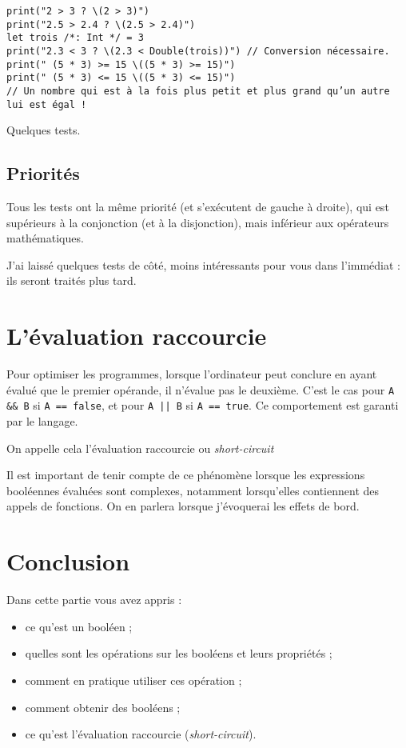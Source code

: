 \begin{listing}[h]
\begin{verbatim}
print("2 > 3 ? \(2 > 3)")
print("2.5 > 2.4 ? \(2.5 > 2.4)")
let trois /*: Int */ = 3
print("2.3 < 3 ? \(2.3 < Double(trois))") // Conversion nécessaire.
print(" (5 * 3) >= 15 \((5 * 3) >= 15)")
print(" (5 * 3) <= 15 \((5 * 3) <= 15)")
// Un nombre qui est à la fois plus petit et plus grand qu’un autre lui est égal !

\end{verbatim}
\caption{Quelques tests.}
\end{listing}%
\subsection{Priorités}
Tous les tests ont la même priorité
(et s'exécutent de gauche à droite),
qui est supérieurs à la conjonction (et à la disjonction),
mais inférieur aux opérateurs mathématiques.



J'ai laissé quelques tests de côté, moins intéressants pour vous dans l'immédiat : ils seront traités plus tard.
\section{L'évaluation raccourcie}
Pour optimiser les programmes, lorsque l'ordinateur peut conclure en ayant évalué que le premier opérande, il n'évalue pas le deuxième. C'est le cas pour \texttt{A && B} si \texttt{A == false},
et pour \texttt{A || B} si \texttt{A == true}.
Ce comportement est garanti par le langage.

On appelle cela l'évaluation raccourcie ou \emph{short-circuit}

Il est important de tenir compte de ce phénomène lorsque les expressions booléennes évaluées sont complexes, notamment lorsqu'elles contiennent des appels de fonctions. On en parlera lorsque j'évoquerai les effets de bord.

\section*{Conclusion}
{}
Dans cette partie vous avez appris :
\begin{itemize}
\item ce qu'est un booléen ;
\item quelles sont les opérations sur les booléens et leurs propriétés ;
\item comment en pratique utiliser ces opération ;
\item comment obtenir des booléens ;
\item ce qu'est l'évaluation raccourcie (\emph{short-circuit}).
\end{itemize}
